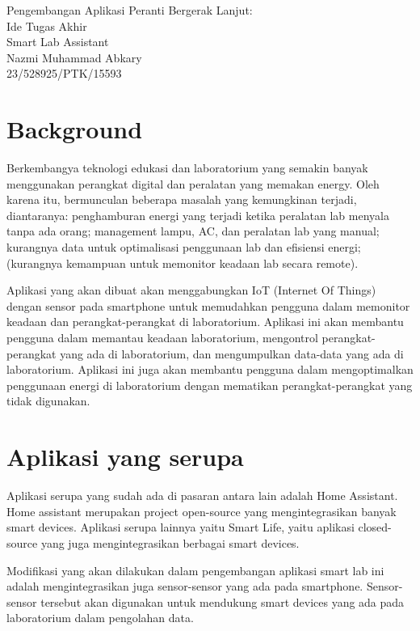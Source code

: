 \documentclass{ugm-report}
\begin{document}
\begin{singlespace}
	\begin{center}
		\fontsize{14pt}{16pt}\selectfont
		Pengembangan Aplikasi Peranti Bergerak Lanjut:\\ Ide Tugas Akhir \\ Smart Lab Assistant\\
		\normalsize
		Nazmi Muhammad Abkary\\
		23/528925/PTK/15593
	\end{center}
\end{singlespace}

\section{Background}
Berkembangya teknologi edukasi dan laboratorium yang semakin banyak menggunakan perangkat digital dan peralatan yang memakan energy. Oleh karena itu, bermunculan beberapa masalah yang kemungkinan terjadi, diantaranya: penghamburan energi yang terjadi ketika peralatan lab menyala tanpa ada orang; management lampu, AC, dan peralatan lab yang manual; kurangnya data untuk optimalisasi penggunaan lab dan efisiensi energi; (kurangnya kemampuan untuk memonitor keadaan lab secara remote). \par
Aplikasi yang akan dibuat akan menggabungkan IoT (Internet Of Things) dengan sensor pada smartphone untuk memudahkan pengguna dalam memonitor keadaan dan  perangkat-perangkat di laboratorium. Aplikasi ini akan membantu pengguna dalam memantau keadaan laboratorium, mengontrol perangkat-perangkat yang ada di laboratorium, dan mengumpulkan data-data yang ada di laboratorium. Aplikasi ini juga akan membantu pengguna dalam mengoptimalkan penggunaan energi di laboratorium dengan mematikan perangkat-perangkat yang tidak digunakan.
\section{Aplikasi yang serupa}
Aplikasi serupa yang sudah ada di pasaran antara lain adalah Home Assistant. Home assistant merupakan project open-source yang mengintegrasikan banyak smart devices. Aplikasi serupa lainnya yaitu Smart Life, yaitu aplikasi closed-source yang juga mengintegrasikan berbagai smart devices. \par
Modifikasi yang akan dilakukan dalam pengembangan aplikasi smart lab ini adalah mengintegrasikan juga sensor-sensor yang ada pada smartphone. Sensor-sensor tersebut akan digunakan untuk mendukung smart devices yang ada pada laboratorium dalam pengolahan data.
\end{document}
